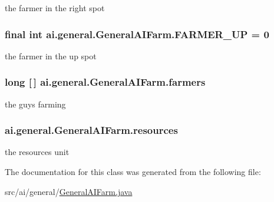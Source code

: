 \label{classai_1_1general_1_1_general_a_i_farm_ad3a3956aee09fbbc3f1f471914ce9f9d}
the farmer in the right spot \hypertarget{classai_1_1general_1_1_general_a_i_farm_a6f7e0293a23d11a27bfc7aad449e1c2f}{
\subsubsection[{FARMER\_\-UP}]{\setlength{\rightskip}{0pt plus 5cm}final int {\bf ai.general.GeneralAIFarm.FARMER\_\-UP} = 0}}
\label{classai_1_1general_1_1_general_a_i_farm_a6f7e0293a23d11a27bfc7aad449e1c2f}
the farmer in the up spot \hypertarget{classai_1_1general_1_1_general_a_i_farm_ac364667b05485e9002f5d626eea25236}{
\subsubsection[{farmers}]{\setlength{\rightskip}{0pt plus 5cm}long \mbox{[}$\,$\mbox{]} {\bf ai.general.GeneralAIFarm.farmers}}}
\label{classai_1_1general_1_1_general_a_i_farm_ac364667b05485e9002f5d626eea25236}
the guys farming \hypertarget{classai_1_1general_1_1_general_a_i_farm_a6461ff6cb7c7555aba9d283a957138ce}{
\subsubsection[{resources}]{ {\bf ai.general.GeneralAIFarm.resources}}}
\label{classai_1_1general_1_1_general_a_i_farm_a6461ff6cb7c7555aba9d283a957138ce}
the resources unit 

The documentation for this class was generated from the following file:\begin{DoxyCompactItemize}
\item 
src/ai/general/\hyperlink{_general_a_i_farm_8java}{GeneralAIFarm.java}\end{DoxyCompactItemize}

